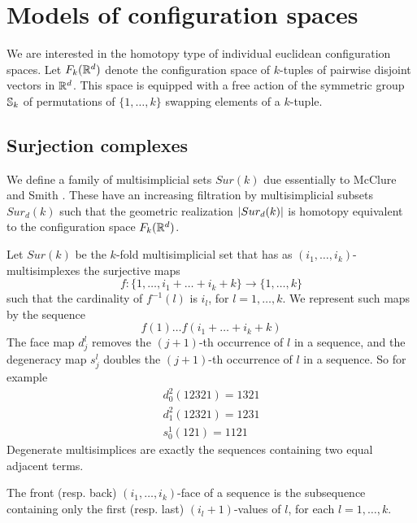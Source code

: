 
\section{Models of configuration spaces}


We are interested in the homotopy type of individual euclidean configuration spaces.
Let $F_k(\mathbb{R}^{d})$ denote the configuration space of $k$-tuples of pairwise disjoint vectors in $\mathbb{R}^{d}$.
This space is equipped with a free action of the symmetric group $\mathbb{S}_k$  of permutations of $\{1,\dots,k\}$ swapping elements of a $k$-tuple.

\subsection{Surjection complexes}

We define a family of multisimplicial sets
$Sur(k)$ due essentially to McClure and Smith \cite{MS}.
These have an increasing filtration by multisimplicial subsets
$Sur_d(k)$ such that the geometric realization
$\lvert Sur_d(k)\rvert$ is homotopy equivalent to the configuration space
$F_k(\mathbb{R}^d)$.


\begin{definition}
	Let $Sur(k)$  be the $k$-fold multisimplicial set that has
	as $(i_1,\dots,i_k)$-multisimplexes
	the surjective maps $$f:\{1,\dots,i_1+\dots+i_k+k\} \to  \{1,\dots,k\}$$ such that
	the cardinality of $f^{-1}(l)$ is $i_l$, for $l=1,\dots,k$.
	We represent such maps by the sequence
	$$f(1) \dots f(i_1+\dots+i_k+k)$$
	The face map
	$d^l_j$ removes the $(j+1)$-th occurrence of $l$ in a sequence, and the degeneracy map
	$s^l_j$ doubles the $(j+1)$-th occurrence of $l$ in a sequence.
	So for example
	\begin{align*}
		d^2_0(12321)=1321 \\ d^2_1(12321)=1231 \\ s^1_0(121)=1121
	\end{align*}
	Degenerate multisimplices are exactly the sequences containing two equal adjacent terms.

	The front  (resp. back) $(i_1,\dots,i_k)$-face of a sequence is the subsequence containing only the first (resp. last)
	$(i_l+1)$-values of $l$, for each
	$l=1,\dots,k$.
\end{definition}

